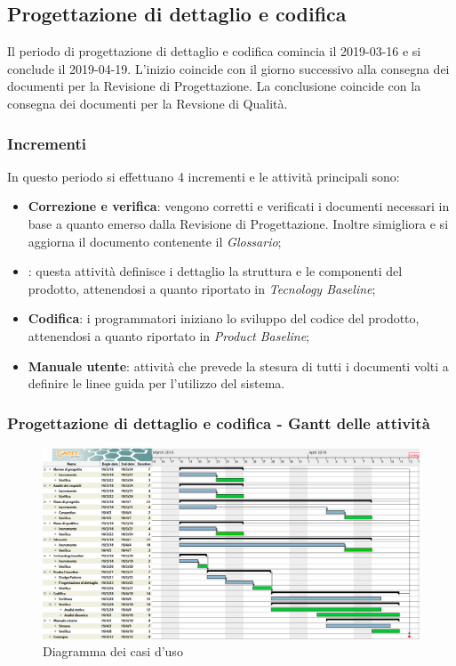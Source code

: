 \subsection{Progettazione di dettaglio e codifica}
Il periodo di progettazione di dettaglio e codifica comincia il 2019-03-16 e si conclude il 2019-04-19. L'inizio coincide con il giorno successivo alla consegna dei documenti per la Revisione di Progettazione. La conclusione coincide con la consegna dei documenti per la Revsione di Qualità. 
\subsubsection{Incrementi}
In questo periodo si effettuano 4 incrementi e le attività principali sono:
\begin{itemize}
\item{\textbf{Correzione e verifica}: vengono corretti e verificati i documenti necessari in base a quanto emerso dalla Revisione di Progettazione. Inoltre simigliora e si aggiorna il documento contenente il \emph{Glossario};} 
\item{\textbf{}: questa attività definisce i dettaglio la struttura e le componenti del prodotto, attenendosi a quanto riportato in \emph{Tecnology Baseline};} 
\item{\textbf{Codifica}: i programmatori iniziano lo sviluppo del codice del prodotto, attenendosi a quanto riportato in \emph{Product Baseline};}	
\item{\textbf{Manuale utente}: attività che prevede la stesura di tutti i documenti volti a definire le linee guida per l'utilizzo del sistema.}
\end{itemize}

\subsubsection{Progettazione di dettaglio e codifica - Gantt delle attività}

\begin{figure} [H]
	\centering
	\includegraphics[scale=0.35]{Res/Gantt/Codifica}
	\caption{Diagramma dei casi d'uso}\label{}
\end{figure}

\pagebreak
